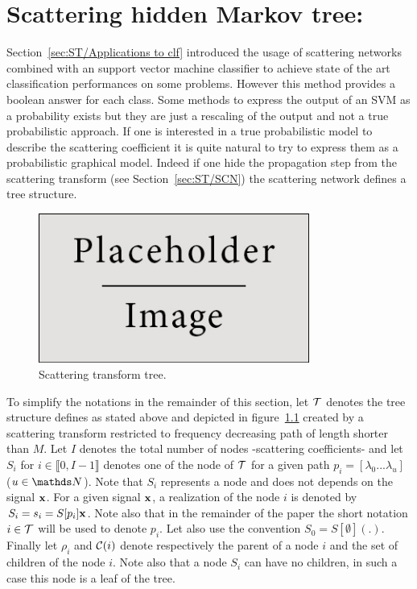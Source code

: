 \documentclass[a4paper,11pt]{report}
\begin{document}
		
\chapter{Scattering hidden Markov tree:}
  \label{chap:SHMT}
  Section~\ref{sec:ST/Applications to clf} introduced the usage of scattering networks combined with an support vector machine classifier to achieve state of the art classification performances on some problems. However this method provides a boolean answer for each class. Some methods to express the output of an SVM as a probability exists \cite{platt1999probabilistic} but they are just a rescaling of the output and not a true probabilistic approach. If one is interested in a true probabilistic model to describe the scattering coefficient it is quite natural to try to express them as a probabilistic graphical model. Indeed if one hide the propagation step from the scattering transform (see Section~\ref{sec:ST/SCN}) the scattering network defines a tree structure. \\

	\begin{figure}
			\begin{center}
				\includegraphics[width=3.5in]{placeholder.jpg}
				\caption{Scattering transform tree.} %
				\label{fig:ST tree}
			\end{center}
	\end{figure}
  
  To simplify the notations in the remainder of this section, let $\mathcal{T}$ denotes the tree  structure defines as stated above and depicted in figure~\ref{fig:ST tree} created by a  scattering transform restricted to frequency decreasing path of length shorter than $M$.  Let $I$ denotes the total number of nodes -\ie scattering coefficients- and let $S_{i}$ for $i \in \llbracket0, I-1 \rrbracket$ denotes one of the node of $\mathcal{T}$ for a given path $p_{i} = [\lambda_{0} ... \lambda_{u}]$ ($u\in \dsN$). Note that $S_{i}$ represents a node and does not depends on the signal ${\bf x}$. For a given signal ${\bf x}$, a realization of the node $i$ is denoted by $S_{i}= s_{i} = S[p_{i}]{\bf x}$. Note also that in the remainder of the paper the short notation $i \in \mathcal{T}$ will be used to denote $p_{i}$. Let also use the convention $S_{0} = S[\emptyset](.)$. Finally let $\rho_{i}$ and $\mathcal{C}(i)$ denote respectively the parent of a node $i$ and the set of children of the node $i$. Note also that a node $S_{i}$ can have no children, in such a case this node is a leaf of the tree.\\
  
\end{document}
